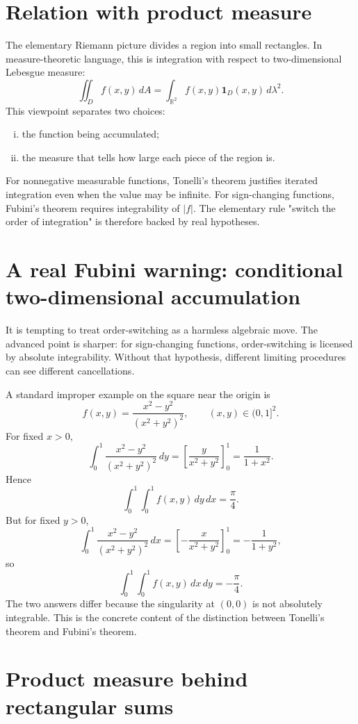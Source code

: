 \section{Relation with product measure}

The elementary Riemann picture divides a region into small rectangles.  In measure-theoretic language, this is integration with respect to two-dimensional Lebesgue measure:
\[
  \iint_D f(x,y)\,dA
  =\int_{\mathbb R^2} f(x,y)\mathbf 1_D(x,y)\,d\lambda^2.
\]
This viewpoint separates two choices:
\begin{enumerate}[(i)]
  \item the function being accumulated;
  \item the measure that tells how large each piece of the region is.
\end{enumerate}

For nonnegative measurable functions, Tonelli's theorem justifies iterated integration even when the value may be infinite.  For sign-changing functions, Fubini's theorem requires integrability of \(|f|\).  The elementary rule "switch the order of integration" is therefore backed by real hypotheses.

\section{A real Fubini warning: conditional two-dimensional accumulation}

It is tempting to treat order-switching as a harmless algebraic move.  The advanced point is sharper: for sign-changing functions, order-switching is licensed by absolute integrability.  Without that hypothesis, different limiting procedures can see different cancellations.

A standard improper example on the square near the origin is
\[
  f(x,y)=\frac{x^2-y^2}{(x^2+y^2)^2},\qquad (x,y)\in(0,1]^2.
\]
For fixed \(x>0\),
\[
  \int_0^1 \frac{x^2-y^2}{(x^2+y^2)^2}\,dy
  =\left[\frac{y}{x^2+y^2}\right]_{0}^{1}
  =\frac{1}{1+x^2}.
\]
Hence
\[
  \int_0^1\int_0^1 f(x,y)\,dy\,dx=\frac{\pi}{4}.
\]
But for fixed \(y>0\),
\[
  \int_0^1 \frac{x^2-y^2}{(x^2+y^2)^2}\,dx
  =\left[-\frac{x}{x^2+y^2}\right]_{0}^{1}
  =-\frac{1}{1+y^2},
\]
so
\[
  \int_0^1\int_0^1 f(x,y)\,dx\,dy=-\frac{\pi}{4}.
\]
The two answers differ because the singularity at \((0,0)\) is not absolutely integrable.  This is the concrete content of the distinction between Tonelli's theorem and Fubini's theorem.

\section{Product measure behind rectangular sums}

